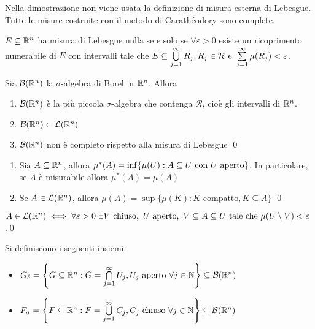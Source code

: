 \begin{remark}
	Nella dimostrazione non viene usata la definizione di misura esterna di Lebesgue. Tutte le misure costruite con il metodo di Carathéodory sono complete.
\end{remark}

\begin{definition}
	$E \subseteq \mathbb{R}^n$ ha misura di Lebesgue nulla se e solo se $\forall \varepsilon > 0$ esiste un ricoprimento numerabile di $E$ con intervalli tale che $E \subseteq \bigcup\limits_{j=1}^\infty R_j, R_j \in \mathcal{R} \text{ e } \sum\limits_{j=1}^\infty \mu(R_j)<\varepsilon$.
\end{definition}

\begin{theorem}
	Sia $\mathcal{B}(\mathbb{R}^n)$ la $\sigma$-algebra di Borel in $\mathbb{R}^n$. Allora
	\begin{enumerate}
		\item $\mathcal{B}(\mathbb{R}^n)$ è la più piccola $\sigma$-algebra che contenga $\mathcal{R}$, cioè gli intervalli di $\mathbb{R}^n$.
		\item $\mathcal{B}(\mathbb{R}^n)\subset \mathcal{L}(\mathbb{R}^n)$
		\item $\mathcal{B}(\mathbb{R}^n)$ non è completo rispetto alla misura di Lebesgue
		\qed
	\end{enumerate}
\end{theorem}

\begin{theorem}\leavevmode
	\begin{enumerate}
		\item Sia $A\subseteq\mathbb{R}^n$, allora $\mu^*(A)=\inf\{\mu(U):A\subseteq U \text{ con } U \text{ aperto}\}$. In particolare, se $A$ è misurabile allora $\mu^*(A)=\mu(A)$
		\item Se $A \in \mathcal{L}(\mathbb{R}^n)$, allora $\mu(A)=\sup\{\mu(K):K \text{ compatto}, K \subseteq A\}$
		\qed
	\end{enumerate}
\end{theorem}

\begin{corollary}
	$A \in \mathcal{L}(\mathbb{R}^n) \iff \forall \varepsilon > 0 \ \exists V \text{ chiuso},\ U \text{ aperto},\ V \subseteq A \subseteq U \text{ tale che } \mu(U\setminus V) < \varepsilon$.\qed
\end{corollary}

\begin{definition}
	Si definiscono i seguenti insiemi:
	\begin{itemize}
		\item $G_\delta = \left\{G \subseteq \mathbb{R}^n:G=\bigcap\limits_{j=1}^\infty U_j, U_j \text{ aperto } \forall j \in \mathbb{N}\right\} \subseteq \mathcal{B}(\mathbb{R}^n)$
		\item $F_\sigma = \left\{F \subseteq \mathbb{R}^n:F=\bigcup\limits_{j=1}^\infty C_j, C_j \text{ chiuso } \forall j \in \mathbb{N}\right\} \subseteq \mathcal{B}(\mathbb{R}^n)$
	\end{itemize}
\end{definition}

